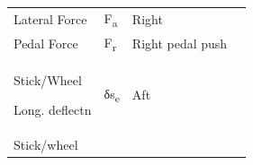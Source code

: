 \documentclass[
]{book}
\begin{document}
\begin{longtable}[]{@{}llll@{}}
\begin{minipage}[t]{0.41\columnwidth}
Lateral Force\strut
\end{minipage} & \begin{minipage}[t]{0.14\columnwidth}\raggedright
F\textsubscript{a}\strut
\end{minipage} & \begin{minipage}[t]{0.17\columnwidth}\raggedright
Right\strut
\end{minipage} & \begin{minipage}[t]{0.17\columnwidth}\raggedright
\strut
\end{minipage}\tabularnewline
\begin{minipage}[t]{0.41\columnwidth}\raggedright
Pedal Force\strut
\end{minipage} & \begin{minipage}[t]{0.14\columnwidth}\raggedright
F\textsubscript{r}\strut
\end{minipage} & \begin{minipage}[t]{0.17\columnwidth}\raggedright
Right pedal push\strut
\end{minipage} & \begin{minipage}[t]{0.17\columnwidth}\raggedright
\strut
\end{minipage}\tabularnewline
\begin{minipage}[t]{0.41\columnwidth}\raggedright
Stick/Wheel

Long. deflectn\strut
\end{minipage} & \begin{minipage}[t]{0.14\columnwidth}\raggedright
δs\textsubscript{e}\strut
\end{minipage} & \begin{minipage}[t]{0.17\columnwidth}\raggedright
Aft\strut
\end{minipage} & \begin{minipage}[t]{0.17\columnwidth}\raggedright
\strut
\end{minipage}\tabularnewline
\begin{minipage}[t]{0.41\columnwidth}\raggedright
Stick/wheel


\end{minipage}
\end{longtable}
\end{document}
